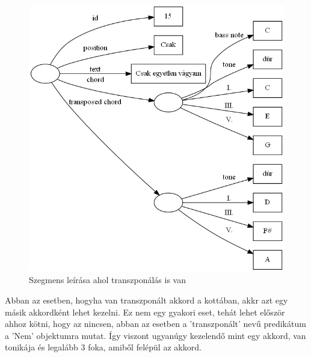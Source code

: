 \begin{figure}[h]
	\includegraphics[scale=0.5]{images/img_src/rdf_graph_5.png}
	\caption{Szegmens leírása ahol transzponálás is van}
	\label{fig:graph5}
\end{figure}
Abban az esetben, hogyha van transzponált akkord a kottában, akkr azt egy másik akkordként lehet kezelni. Ez nem egy gyakori eset, tehát lehet először ahhoz kötni, hogy az nincsen, abban az esetben a 'transzponált' nevű predikátum a 'Nem' objektumra mutat. Így viszont ugyanúgy kezelendő mint egy akkord, van tonikája és legalább 3 foka, amiből felépül az akkord.
\newpage
